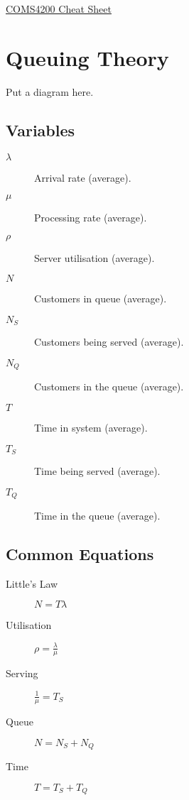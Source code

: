 \documentclass[landscape]{cheat}
\begin{document}
\footnotesize
\begin{multicols*}{3}

\begin{center}
\Large{\underline{COMS4200 Cheat Sheet}} \\
\end{center}

\section{Queuing Theory}

Put a diagram here.

\subsection{Variables}
\begin{description}
    \item[$\lambda$] Arrival rate (average).
    \item[$\mu$] Processing rate (average).
    \item[$\rho$] Server utilisation (average).
    \item[$N$] Customers in queue (average).
    \item[$N_S$] Customers being served (average).
    \item[$N_Q$] Customers in the queue (average).
    \item[$T$] Time in system (average).
    \item[$T_S$] Time being served (average).
    \item[$T_Q$] Time in the queue (average).
\end{description}

\subsection{Common Equations}
\begin{description}
    \item[Little's Law] $N = T\lambda$
    \item[Utilisation] $\rho = \frac \lambda \mu$
    \item[Serving] $\frac 1 \mu = T_S$
    \item[Queue] $N = N_S + N_Q$
    \item[Time] $T = T_S + T_Q$
\end{description}


\end{multicols*}
\end{document}
